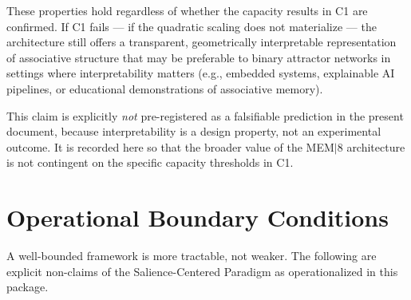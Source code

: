 \documentclass[11pt, a4paper]{article}
\newcommand{\mem}{MEM$|$8}
\begin{document}
These properties hold regardless of whether the capacity results in C1 are
confirmed.  If C1 fails — if the quadratic scaling does not materialize — the
architecture still offers a transparent, geometrically interpretable
representation of associative structure that may be preferable to binary
attractor networks in settings where interpretability matters (e.g., embedded
systems, explainable AI pipelines, or educational demonstrations of associative
memory).

This claim is explicitly \emph{not} pre-registered as a falsifiable prediction
in the present document, because interpretability is a design property, not an
experimental outcome.  It is recorded here so that the broader value of the
\mem{} architecture is not contingent on the specific capacity thresholds in C1.

\section{Operational Boundary Conditions}
\label{sec:boundaries}

A well-bounded framework is more tractable, not weaker.  The following are explicit
non-claims of the Salience-Centered Paradigm as operationalized in this package.
\end{document}
